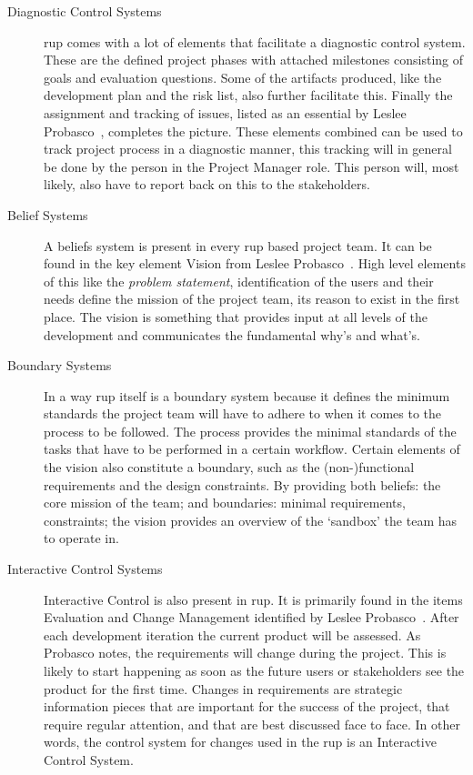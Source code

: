 \begin{description}
\item[Diagnostic Control Systems] 
\Gls{rup} comes with a lot of elements that facilitate a diagnostic control system. 
These are the defined project phases with attached milestones consisting of goals and evaluation questions. Some of the artifacts produced, like the development plan and the risk list, also further facilitate this. Finally the assignment and tracking of issues, listed as an essential by Leslee Probasco~\citep{probasco2000ten}, completes the picture.
These elements combined can be used to track project process in a diagnostic manner, this tracking will in general be done by the person in the Project Manager role. This person will, most likely, also have to report back on this to the stakeholders.

\item[Belief Systems]
A beliefs system is present in every \ac{rup} based project team. It can be found in the key element Vision from Leslee Probasco~\citep{probasco2000ten}.
High level elements of this like the \emph{problem statement}, identification of the users and their needs define the mission of the project team, its reason to exist in the first place.
The vision is something that provides input at all levels of the development and communicates the fundamental why's and what's.

\item[Boundary Systems]
In a way \ac{rup} itself is a boundary system because it defines the minimum standards the project team will have to adhere to when it comes to the process to be followed.
The process provides the minimal standards of the tasks that have to be performed in a certain workflow.
Certain elements of the vision also constitute a boundary, such as the (non-)functional requirements and the design constraints. By providing both beliefs: the core mission of the team; and boundaries: minimal requirements, constraints; the vision provides an overview of the `sandbox' the team has to operate in.

\item[Interactive Control Systems] 
Interactive Control is also present in \ac{rup}.
It is primarily found in the items Evaluation and Change Management identified by Leslee Probasco~\citep{probasco2000ten}.
After each development iteration the current product will be assessed.
As Probasco notes, the requirements will change during the project. This is likely to start happening as soon as the future users or stakeholders see the product for the first time.
Changes in requirements are strategic information pieces that are important for the success of the project, that require regular attention, and that are best discussed face to face.
In other words, the control system for changes used in the \ac{rup} is an Interactive Control System.
\end{description}

